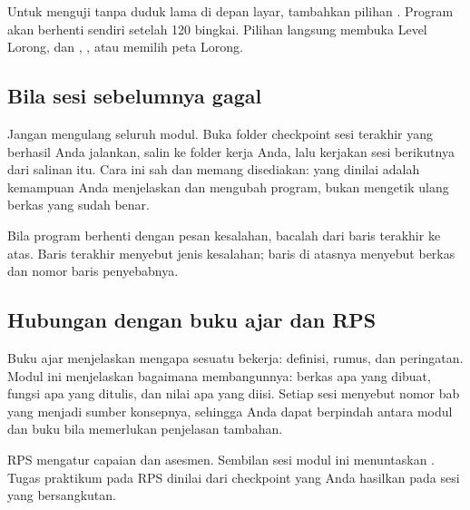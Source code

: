 Untuk menguji tanpa duduk lama di depan layar, tambahkan pilihan
. Program akan berhenti sendiri setelah 120 bingkai.
Pilihan  langsung membuka Level Lorong, dan
, , atau  memilih peta Lorong.

\subsection*{Bila sesi sebelumnya gagal}

Jangan mengulang seluruh modul. Buka folder checkpoint sesi terakhir yang
berhasil Anda jalankan, salin ke folder kerja Anda, lalu kerjakan sesi
berikutnya dari salinan itu. Cara ini sah dan memang disediakan: yang
dinilai adalah kemampuan Anda menjelaskan dan mengubah program, bukan
mengetik ulang berkas yang sudah benar.

Bila program berhenti dengan pesan kesalahan, bacalah dari baris terakhir ke
atas. Baris terakhir menyebut jenis kesalahan; baris di atasnya menyebut
berkas dan nomor baris penyebabnya.

\subsection*{Hubungan dengan buku ajar dan RPS}

Buku ajar menjelaskan mengapa sesuatu bekerja: definisi, rumus, dan
peringatan. Modul ini menjelaskan bagaimana membangunnya: berkas apa yang
dibuat, fungsi apa yang ditulis, dan nilai apa yang diisi. Setiap sesi
menyebut nomor bab yang menjadi sumber konsepnya, sehingga Anda dapat
berpindah antara modul dan buku bila memerlukan penjelasan tambahan.

RPS mengatur capaian dan asesmen. Sembilan sesi modul ini menuntaskan
\ModulSubCPMK. Tugas praktikum pada RPS dinilai dari checkpoint yang Anda
hasilkan pada sesi yang bersangkutan.
